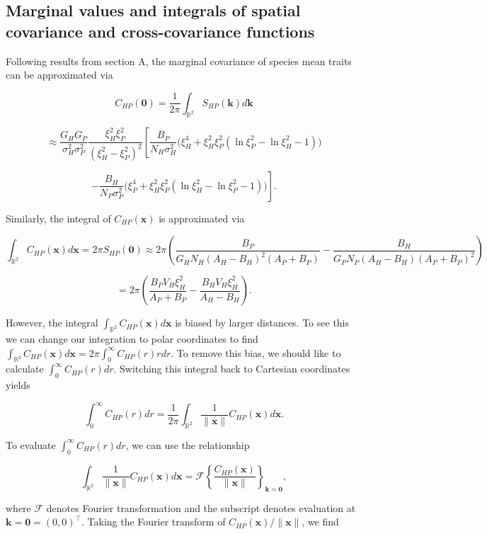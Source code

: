 \documentclass{article}
\begin{document}
\hypertarget{marginal-values-and-integrals-of-spatial-covariance-and-cross-covariance-functions}{%
\subsection{Marginal values and integrals of spatial covariance and
cross-covariance
functions}\label{marginal-values-and-integrals-of-spatial-covariance-and-cross-covariance-functions}}

Following results from section A, the marginal covariance of species
mean traits can be approximated via

\[C_{HP}(\pmb 0)=\frac{1}{2\pi}\int_{\mathbb R^2}S_{HP}(\pmb k)d\pmb k\]

\[\approx \frac{G_HG_P}{\sigma_H^2\sigma_P^2}\frac{\xi_H^2\xi_P^2}{(\xi_H^2-\xi_P^2)^2}\left[\frac{B_P}{N_H\sigma_H^2}\Big(\xi_H^4+\xi_H^2\xi_P^2(\ln\xi_P^2-\ln\xi_H^2-1)\Big)\right.\]

\[\left.-\frac{B_H}{N_P\sigma_P^2}\Big(\xi_P^4+\xi_H^2\xi_P^2(\ln\xi_H^2-\ln\xi_P^2-1)\Big)\right].\]

Similarly, the integral of \(C_{HP}(\pmb x)\) is approximated via

\[\int_{\mathbb R^2}C_{HP}(\pmb x)d\pmb x=2\pi S_{HP}(\pmb 0)\approx2\pi \left(\frac{B_P}{G_HN_H(A_H-B_H)^2(A_P+B_P)}-\frac{B_H}{G_PN_P(A_H-B_H)(A_P+B_P)^2}\right)\]

\[=2\pi\left(\frac{B_PV_H\xi_H^2}{A_P+B_P}-\frac{B_HV_H\xi_H^2}{A_H-B_H}\right).\]

However, the integral \(\int_{\mathbb R^2}C_{HP}(\pmb x)d\pmb x\) is
biased by larger distances. To see this we can change our integration to
polar coordinates to find
\(\int_{\mathbb R^2}C_{HP}(\pmb x)d\pmb x=2\pi\int_0^\infty C_{HP}(r)rdr\).
To remove this bias, we should like to calculate
\(\int_0^\infty C_{HP}(r)dr\). Switching this integral back to Cartesian
coordinates yields

\[\int_0^\infty C_{HP}(r)dr=\frac{1}{2\pi}\int_{\mathbb R^2}\frac{1}{\|\pmb x\|}C_{HP}(\pmb x)d\pmb x.\]

To evaluate \(\int_0^\infty C_{HP}(r)dr\), we can use the relationship

\[\int_{\mathbb R^2}\frac{1}{\|\pmb x\|}C_{HP}(\pmb x)d\pmb x=\mathcal F\left\{\frac{C_{HP}(\pmb x)}{\|\pmb x\|}\right\}_{\pmb k=\pmb 0},\]

where \(\mathcal F\) denotes Fourier transformation and the subscript
denotes evaluation at \(\pmb k=\pmb 0=(0,0)^\top\). Taking the Fourier
transform of \(C_{HP}(\pmb x)/\|\pmb x\|\), we find
\end{document}
